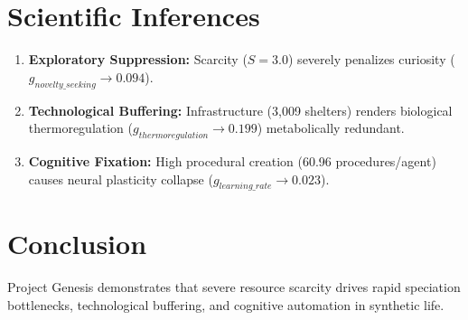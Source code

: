 \documentclass[11pt,a4paper,twocolumn]{article}
\begin{document}
\section{Scientific Inferences}
\begin{enumerate}
    \item \textbf{Exploratory Suppression:} Scarcity ($S=3.0$) severely penalizes curiosity ($g_{novelty\_seeking} \to 0.094$).
    \item \textbf{Technological Buffering:} Infrastructure (3,009 shelters) renders biological thermoregulation ($g_{thermoregulation} \to 0.199$) metabolically redundant.
    \item \textbf{Cognitive Fixation:} High procedural creation (60.96 procedures/agent) causes neural plasticity collapse ($g_{learning\_rate} \to 0.023$).
\end{enumerate}

\section{Conclusion}
Project Genesis demonstrates that severe resource scarcity drives rapid speciation bottlenecks, technological buffering, and cognitive automation in synthetic life.
\end{document}
